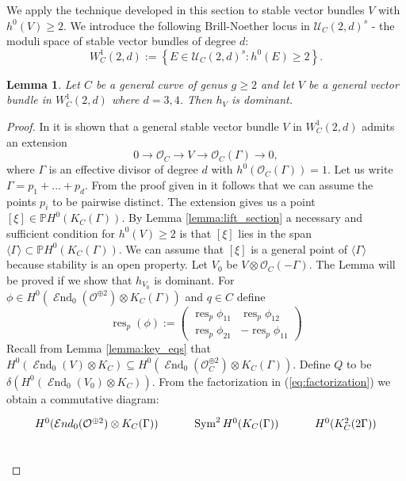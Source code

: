 \documentclass[12pt]{extarticle}
\newtheorem{lemma}[theorem]{Lemma}
\theoremstyle{definition}
\numberwithin{theorem}{section}
\newcommand{\PP}{\mathbb{P}}
\newcommand{\OO}{\mathcal{O}}
\newcommand{\op}{\operatorname}
\DeclareMathOperator{\End}{\mathcal{E}nd}
\begin{document}
We apply the technique developed in this section to stable vector bundles $V$ with $h^0(V)\geq 2$. We introduce the following Brill-Noether locus in $\mathcal{U}_C(2,d)^s$ - the moduli space of stable vector bundles of degree $d$:
\begin{equation*}
W^1_C(2,d) := \left\{ E \in\mathcal{U}_C(2,d)^s : h^0(E)\geq 2 \right\}.
\end{equation*}
\begin{lemma}\label{lemma:restricted_hitchin_3,4}
Let $C$ be a general curve of genus $g \geq 2$ and let $V$ be a general vector bundle in $W^1_C(2,d)$ where $d = 3,4$. Then $h_V$ is dominant.
\end{lemma}
\begin{proof}
In \cite{Teixidor} it is shown that a general stable vector bundle $V$ in $W^1_C(2,d)$ admits an extension
\begin{equation}\label{eq:ext_teixidor}
0 \to \OO_C \to V \to \OO_C(\Gamma) \to 0,
\end{equation}
where $\Gamma$ is an effective divisor of degree $d$ with $h^0(\OO_C(\Gamma)) = 1$. Let us write $\Gamma = p_1 + \ldots + p_d$. From the proof given in \cite{Teixidor} it follows that we can assume the points $p_i$ to be pairwise distinct. The extension gives us a point $[\xi] \in \PP H^0(K_C(\Gamma))$. By Lemma \ref{lemma:lift_section} a necessary and sufficient condition for $h^0(V)\geq 2$ is that $[\xi]$ lies in the span $\langle \Gamma \rangle \subset \PP H^0(K_C(\Gamma))$. We can assume that $[\xi]$ is a general point of $\langle \Gamma \rangle$ because stability is an open property. Let $V_0$ be $V\otimes \OO_C(-\Gamma)$. The Lemma will be proved if we show that $h_{V_0}$ is dominant. For $\phi \in H^0(\End_0(\OO^{\oplus 2})\otimes K_C(\Gamma))$ and $q\in C$ define 
\begin{equation*}
\op{res}_p(\phi) := \begin{pmatrix}
\op{res}_p\phi_{11} & \op{res}_p \phi_{12} \\
\op{res}_p \phi_{21} & -\op{res}_p \phi_{11}
\end{pmatrix}
\end{equation*}
Recall from Lemma \ref{lemma:key_eqs} that $H^0(\End_0(V)\otimes K_C) \subseteq H^0(\End_0(\OO_C^{\oplus 2} ) \otimes K_C(\Gamma))$. Define $Q$ to be $\delta(H^0(\End_0(V_0) \otimes K_C))$. From the factorization in (\ref{eq:factorization}) we obtain a commutative diagram:
\begin{equation}
\begin{tikzcd}
	{H^0(\mathcal{E}nd_0(\mathcal{O}^{\oplus 2})\otimes K_C(\Gamma))} & {\operatorname{Sym}^2H^0(K_C(\Gamma))} & {H^0(K_C^2(2\Gamma))} \\

\end{tikzcd}
\end{equation}
\end{proof}
\end{document}
